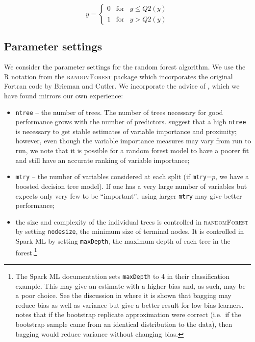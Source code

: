 \documentclass[10pt,letterpaper]{article}
\newcommand{\randomforest}{\textsc{randomForest}\xspace}
\newcommand{\mtry}{\texttt{mtry}\xspace}
\newcommand{\ntree}{\texttt{ntree}\xspace}
\begin{document}
$$
\ddot{y} =    \left\{ \begin{array}{rcl}
			  0 & \mbox{for} & y \leq Q2(y) \\
			  1 & \mbox{for} & y > Q2(y)
		 \end{array}\right.
$$


\subsection{Parameter settings}
We consider the parameter settings for the random forest algorithm. We use the R notation from the \randomforest
package \cite{Liaw.and.Weiner.2002} which incorporates the original Fortran code by Brieman and Cutler.  We incorporate
the advice of \cite{Liaw.and.Weiner.2002}, which we have found mirrors our own experience:
\begin{itemize}
\item \ntree{}  -- the number of trees.  The number of trees necessary for good performance grows with the number of
  predictors.  \cite{Liaw.and.Weiner.2002} suggest that a high \ntree is necessary to get stable estimates of variable
  importance and proximity; however, even though the variable importance measures may vary from run to run, we note that
  it is possible for a random forest model to have a poorer fit and still have an accurate ranking of variable
  importance;
\item \mtry{}  -- the number of variables considered at each split (if \mtry=$p$, we have a boosted decision
  tree model).  If one has a very large number of variables but expects only very few to be ``important'', using larger \mtry may give
  better performance;
\item the size and complexity of the individual trees is controlled in \randomforest by setting \texttt{nodesize}, the
  minimum size of terminal nodes. It is controlled in Spark ML by setting \texttt{maxDepth}, the maximum depth of each
  tree in the forest.\footnote{The Spark ML documentation \cite{Spark.2016} sets \texttt{maxDepth} to 4 in their
    classification example. This may give an estimate with a higher bias and, as such, may be a poor choice. See the
    discussion in \cite{Dietterich.2002} where it is shown that bagging may reduce bias as well as variance but give a
    better result for low bias learners. \cite{Dietterich.2002} notes that if the bootstrap replicate approximation were
    correct (i.e.~if the bootstrap sample came from an identical distribution to the data), then bagging would reduce
    variance without changing bias.}
\end{itemize}
\end{document}

